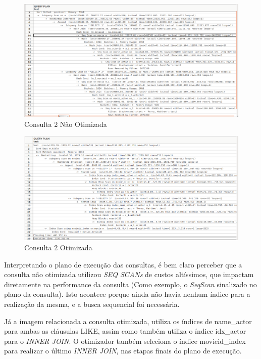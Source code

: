 \documentclass[
	12pt,				%
	oneside,			%
	a4paper,			%
	brazil				%
	]{abntex2}
\begin{document}
\newpage

\begin{landscape}
\begin{figure}
\centering
\includegraphics[scale = 0.7]{Consulta2_nao_otimizada.png}
\caption{Consulta 2 Não Otimizada}
\end{figure}
\begin{figure}
\centering
\includegraphics[scale = 0.7]{consulta2.png}
\caption{Consulta 2 Otimizada}
\end{figure}
\end{landscape}

Interpretando o plano de execução das consultas, é bem claro perceber que a consulta não otimizada utilizou \textit{SEQ SCANs} de custos altíssimos, que impactam diretamente na performance da consulta (Como exemplo, o \textit{SeqScan} sinalizado no plano da consulta). Isto acontece porque ainda não havia nenhum índice para a realização da mesma, e a busca sequencial foi necessária.

Já a imagem relacionada a consulta otimizada, utiliza os índices de name\_actor para ambas as cláusulas LIKE, assim como também utiliza o índice idx\_actor para o \textit{INNER JOIN}. O otimizador também seleciona o índice movieid\_index para realizar o último \textit{INNER JOIN}, nas etapas finais do plano de execução.
\end{document}
